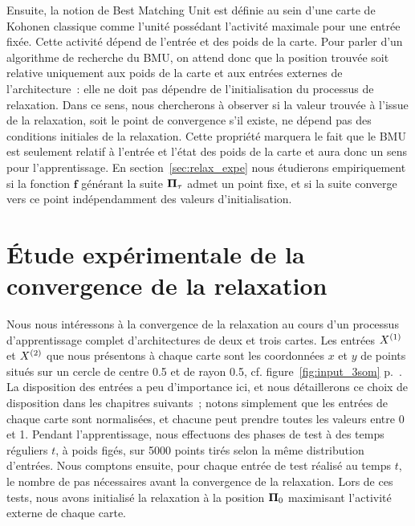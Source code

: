 \documentclass[../main]{subfiles}
\begin{document}
Ensuite, la notion de Best Matching Unit est définie au sein d'une carte de Kohonen classique comme l'unité possédant l'activité maximale pour une entrée fixée. Cette activité dépend de l'entrée et des poids de la carte.
Pour parler d'un algorithme de recherche du BMU, on attend donc que la position trouvée soit relative uniquement aux poids de la carte et aux entrées externes de l'architecture~: elle ne doit pas dépendre de l'initialisation du processus de relaxation.
Dans ce sens, nous chercherons à observer si la valeur trouvée à l'issue de la relaxation, soit le point de convergence s'il existe, ne dépend pas des conditions initiales de la relaxation.
Cette propriété marquera le fait que le BMU est seulement relatif à l'entrée et l'état des poids de la carte et aura donc un sens pour l'apprentissage.
En section~\ref{sec:relax_expe} nous étudierons empiriquement si la fonction $\mathbf{f}$ générant la suite $\mathbf{\Pi}_\tau$ admet un point fixe, et si la suite converge vers ce point indépendamment des valeurs d'initialisation.

\section{\'Etude expérimentale de la convergence de la relaxation}\label{sec:relax_conv}

Nous nous intéressons à la convergence de la relaxation au cours d'un processus d'apprentissage complet d'architectures de deux et trois cartes. 
Les entrées $X^{({1})}$ et $X^{({2})}$ que nous présentons à chaque carte sont les coordonnées $x$ et $y$ de points situés sur un cercle de centre 0.5 et de rayon 0.5, cf. figure~\ref{fig:input_3som} p.~\pageref{fig:input_3som}. La disposition des entrées a peu d'importance ici, et nous détaillerons ce choix de disposition dans les chapitres suivants~; notons simplement que les entrées de chaque carte sont normalisées, et chacune peut prendre toutes les valeurs entre 0 et 1.
Pendant l'apprentissage, nous effectuons des phases de test à des temps réguliers $t$, à poids figés, sur 5000 points tirés selon la même distribution d'entrées. 
Nous comptons ensuite, pour chaque entrée de test réalisé au temps $t$, le nombre de pas nécessaires avant la convergence de la relaxation. Lors de ces tests, nous avons initialisé la relaxation à la position $\mathbf{\Pi}_0$ maximisant l'activité externe de chaque carte.
\end{document}
